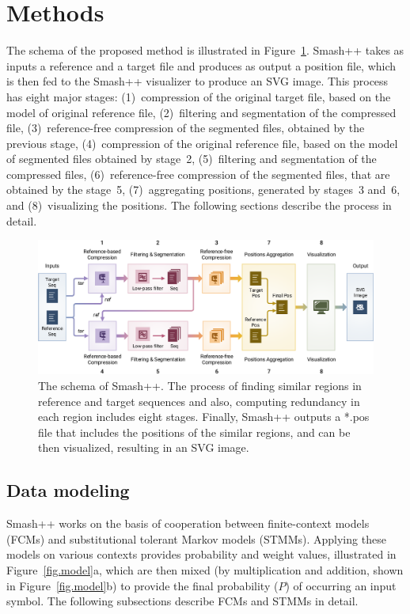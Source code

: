 \documentclass[a4paper,num-refs]{oup-contemporary}
\begin{document}
\section{Methods} \label{sec.methods}
The schema of the proposed method is illustrated in Figure~\ref{fig.schema}. Smash++ takes as inputs a reference and a target file and produces as output a position file, which is then fed to the Smash++ visualizer to produce an SVG image. This process has eight major stages: (1)~compression of the original target file, based on the model of original reference file, (2)~filtering and segmentation of the compressed file, (3)~reference-free compression of the segmented files, obtained by the previous stage, (4)~compression of the original reference file, based on the model of segmented files obtained by stage~2, (5)~filtering and segmentation of the compressed files, (6)~reference-free compression of the segmented files, that are obtained by the stage~5, (7)~aggregating positions, generated by stages~3 and~6, and (8)~visualizing the positions. The following sections describe the process in detail.

\begin{figure}[!t]
  \centering
  \includegraphics[width=.95\linewidth]{fig/schema.pdf}
  \caption{The schema of Smash++. The process of finding similar regions in reference and target sequences and also, computing redundancy in each region includes eight stages. Finally, Smash++ outputs a *.pos file that includes the positions of the similar regions, and can be then visualized, resulting in an SVG image.}
  \label{fig.schema}
\end{figure}

\subsection{Data modeling}
Smash++ works on the basis of cooperation between finite-context models (FCMs) and substitutional tolerant Markov models (STMMs). Applying these models on various contexts provides probability and weight values, illustrated in Figure~\ref{fig.model}a, which are then mixed (by multiplication and addition, shown in Figure~\ref{fig.model}b) to provide the final probability ($P$) of occurring an input symbol. The following subsections describe FCMs and STMMs in detail.
\end{document}
